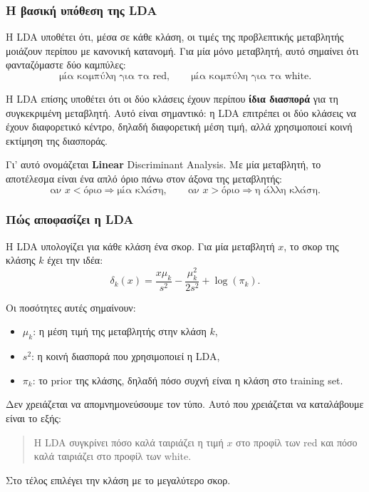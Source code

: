 \documentclass[11pt,a4paper]{article}
\begin{document}
\subsubsection{Η βασική υπόθεση της LDA}

Η LDA υποθέτει ότι, μέσα σε κάθε κλάση, οι τιμές της προβλεπτικής μεταβλητής
μοιάζουν περίπου με κανονική κατανομή. Για μία μόνο μεταβλητή, αυτό σημαίνει
ότι φανταζόμαστε δύο καμπύλες:
\[
\text{μία καμπύλη για τα red}, \qquad
\text{μία καμπύλη για τα white}.
\]

Η LDA επίσης υποθέτει ότι οι δύο κλάσεις έχουν περίπου \textbf{ίδια διασπορά}
για τη συγκεκριμένη μεταβλητή. Αυτό είναι σημαντικό: η LDA επιτρέπει οι δύο
κλάσεις να έχουν διαφορετικό κέντρο, δηλαδή διαφορετική μέση τιμή, αλλά
χρησιμοποιεί κοινή εκτίμηση της διασποράς.

Γι' αυτό ονομάζεται \textbf{Linear} Discriminant Analysis. Με μία μεταβλητή,
το αποτέλεσμα είναι ένα απλό όριο πάνω στον άξονα της μεταβλητής:
\[
\text{αν } x < \text{όριο} \Rightarrow \text{μία κλάση},
\qquad
\text{αν } x > \text{όριο} \Rightarrow \text{η άλλη κλάση}.
\]

\subsubsection{Πώς αποφασίζει η LDA}

Η LDA υπολογίζει για κάθε κλάση ένα σκορ. Για μία μεταβλητή \(x\), το σκορ
της κλάσης \(k\) έχει την ιδέα:
\[
\delta_k(x)
=
\frac{x\mu_k}{s^2}
-
\frac{\mu_k^2}{2s^2}
+ \log(\pi_k).
\]

Οι ποσότητες αυτές σημαίνουν:
\begin{itemize}
    \item \(\mu_k\): η μέση τιμή της μεταβλητής στην κλάση \(k\),
    \item \(s^2\): η κοινή διασπορά που χρησιμοποιεί η LDA,
    \item \(\pi_k\): το prior της κλάσης, δηλαδή πόσο συχνή είναι η κλάση στο
    training set.
\end{itemize}

Δεν χρειάζεται να απομνημονεύσουμε τον τύπο. Αυτό που χρειάζεται να
καταλάβουμε είναι το εξής:
\begin{quote}
Η LDA συγκρίνει πόσο καλά ταιριάζει η τιμή \(x\) στο προφίλ των red και πόσο
καλά ταιριάζει στο προφίλ των white.
\end{quote}

Στο τέλος επιλέγει την κλάση με το μεγαλύτερο σκορ.
\end{document}
